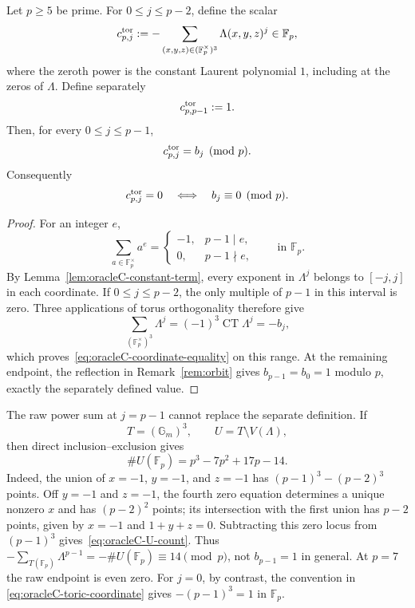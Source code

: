 \begin{theorem}
\label{thm:oracleC-marked-coordinate}
Let $p\geq5$ be prime.  For $0\leq j\leq p-2$, define the scalar
\begin{equation}
 c_{p,j}^{\rm tor}
 :=-\sum_{(x,y,z)\in(\mathbb F_p^\times)^3}
       \Lambda(x,y,z)^j\in\mathbb F_p,
 \label{eq:oracleC-toric-coordinate}
\end{equation}
where the zeroth power is the constant Laurent polynomial $1$, including
at the zeros of $\Lambda$.  Define separately
\[
 c_{p,p-1}^{\rm tor}:=1.
\]
Then, for every $0\leq j\leq p-1$,
\begin{equation}
 c_{p,j}^{\rm tor}=b_j\pmod p.
 \label{eq:oracleC-coordinate-equality}
\end{equation}
Consequently
\begin{equation}
 c_{p,j}^{\rm tor}=0
 \quad\Longleftrightarrow\quad
 b_j\equiv0\pmod p.
 \label{eq:oracleC-marked-zero}
\end{equation}
\end{theorem}

\begin{proof}
For an integer $e$,
\[
 \sum_{a\in\mathbb F_p^\times}a^e
 =\begin{cases}-1,&p-1\mid e,\\0,&p-1\nmid e,
 \end{cases}
 \qquad\text{in }\mathbb F_p.
\]
By Lemma~\ref{lem:oracleC-constant-term}, every exponent in
$\Lambda^j$ belongs to $[-j,j]$ in each coordinate.  If
$0\leq j\leq p-2$, the only multiple of $p-1$ in this interval is zero.
Three applications of torus orthogonality therefore give
\[
 \sum_{(\mathbb F_p^\times)^3}\Lambda^j
 =(-1)^3\operatorname {CT}\Lambda^j=-b_j,
\]
which proves~\eqref{eq:oracleC-coordinate-equality} on this range.  At the
remaining endpoint, the reflection in Remark~\ref{rem:orbit} gives
$b_{p-1}=b_0=1$ modulo $p$, exactly the separately defined value.
\end{proof}

\begin{remark}
\label{rem:oracleC-endpoint}
The raw power sum at $j=p-1$ cannot replace the separate definition.
If
\[
 T=(\mathbb G_m)^3,\qquad U=T\setminus V(\Lambda),
\]
then direct inclusion--exclusion gives
\begin{equation}
 \#U(\mathbb F_p)=p^3-7p^2+17p-14.
 \label{eq:oracleC-U-count}
\end{equation}
Indeed, the union of $x=-1$, $y=-1$, and $z=-1$ has
$(p-1)^3-(p-2)^3$ points.  Off $y=-1$ and $z=-1$, the fourth zero
equation determines a unique nonzero $x$ and has $(p-2)^2$ points; its
intersection with the first union has $p-2$ points, given by
$x=-1$ and $1+y+z=0$.  Subtracting this zero locus from $(p-1)^3$
gives~\eqref{eq:oracleC-U-count}.
Thus
$-\sum_{T(\mathbb F_p)}\Lambda^{p-1}=-\#U(\mathbb F_p)\equiv14\pmod p$,
not $b_{p-1}=1$ in general.  At $p=7$ the raw endpoint is even zero.
For $j=0$, by contrast, the convention in
\eqref{eq:oracleC-toric-coordinate} gives
$-(p-1)^3=1$ in $\mathbb F_p$.
\end{remark}

